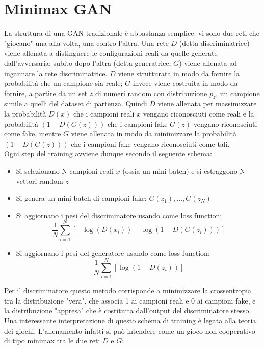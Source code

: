 \documentclass[Lau, noexaminfo, oneside]{sapthesis} %
\begin{document}
\section{Minimax GAN}
La struttura di una GAN tradizionale è abbastanza semplice: vi sono due reti che "giocano" una alla volta, una contro l'altra. Una rete $D$ (detta discriminatrice) viene allenata a distinguere le configurazioni reali da quelle generate dall'avversaria; subito dopo l'altra (detta generatrice, $G$) viene allenata ad ingannare la rete discriminatrice. $D$ viene strutturata in modo da fornire la probabilità che un campione sia reale; $G$ invece viene costruita in modo da fornire, a partire da un set $z$ di numeri random con distribuzione $p_z$, un campione simile a quelli del dataset di partenza. Quindi $D$ viene allenata per massimizzare la probabilità $D(x)$ che i campioni reali $x$ vengano riconosciuti come reali e la probabilità $(1-D(G(z)))$ che i campioni fake $G(z)$ vengano riconosciuti come fake, mentre $G$ viene allenata in modo da minimizzare la probabilità $(1-D(G(z)))$ che i campioni fake vengano riconosciuti come tali.\\
Ogni step del training avviene dunque secondo il seguente schema:
\begin{itemize}
\item Si selezionano N campioni reali $x$ (ossia un mini-batch) e si estraggono N vettori random $z$
\item Si genera un mini-batch di campioni fake: $G(z_1), ..., G(z_N)$
\item Si aggiornano i pesi del discriminatore usando come loss function: 
\begin{equation}
\frac{1}{N}\sum_{i=1}^{N} [-\log(D(x_i)) - \log(1-D(G(z_i)))]
\end{equation}
\item Si aggiornano i pesi del generatore usando come loss function: 
\begin{equation}
\frac{1}{N}\sum_{i=1}^{N} [\log(1-D(z_i))]
\end{equation}
\end{itemize}
Per il discriminatore questo metodo corrisponde a minimizzare la crossentropia tra la distribuzione "vera", che associa 1 ai campioni reali e 0 ai campioni fake, e la distribuzione "appresa" che è costituita dall'output del discriminatore stesso. \\
Una interessante interpretazione di questo schema di training è legata alla teoria dei giochi. L'allenamento infatti si può intendere come un gioco non cooperativo di tipo minimax tra le due reti $D$ e $G$:
\end{document}

